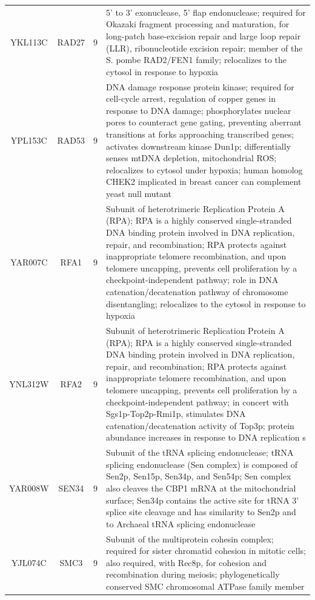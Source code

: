 \documentclass[]{article}
\begin{document}
\begin{longtable}{@{\extracolsep{3pt}} cccp{85mm}}
YKL113C & RAD27 & 9 & 5' to 3' exonuclease, 5' flap endonuclease; required for Okazaki fragment processing and maturation, for long-patch base-excision repair and large loop repair (LLR), ribonucleotide excision repair; member of the S. pombe RAD2/FEN1 family; relocalizes to the cytosol in response to hypoxia \\ 
YPL153C & RAD53 & 9 & DNA damage response protein kinase; required for cell-cycle arrest, regulation of copper genes in response to DNA damage; phosphorylates nuclear pores to counteract gene gating, preventing aberrant transitions at forks approaching transcribed genes; activates downstream kinase Dun1p; differentially senses mtDNA depletion, mitochondrial ROS; relocalizes to cytosol under hypoxia; human homolog CHEK2 implicated in breast cancer can complement yeast null mutant \\ 
YAR007C & RFA1 & 9 & Subunit of heterotrimeric Replication Protein A (RPA); RPA is a highly conserved single-stranded DNA binding protein involved in DNA replication, repair, and recombination; RPA protects against inappropriate telomere recombination, and upon telomere uncapping, prevents cell proliferation by a checkpoint-independent pathway; role in DNA catenation/decatenation pathway of chromosome disentangling; relocalizes to the cytosol in response to hypoxia \\ 
YNL312W & RFA2 & 9 & Subunit of heterotrimeric Replication Protein A (RPA); RPA is a highly conserved single-stranded DNA binding protein involved in DNA replication, repair, and recombination; RPA protects against inappropriate telomere recombination, and upon telomere uncapping, prevents cell proliferation by a checkpoint-independent pathway; in concert with Sgs1p-Top2p-Rmi1p, stimulates DNA catenation/decatenation activity of Top3p; protein abundance increases in response to DNA replication s \\ 
YAR008W & SEN34 & 9 & Subunit of the tRNA splicing endonuclease; tRNA splicing endonuclease (Sen complex) is composed of Sen2p, Sen15p, Sen34p, and Sen54p; Sen complex also cleaves the CBP1 mRNA at the mitochondrial surface; Sen34p contains the active site for tRNA 3' splice site cleavage and has similarity to Sen2p and to Archaeal tRNA splicing endonuclease \\ 
YJL074C & SMC3 & 9 & Subunit of the multiprotein cohesin complex; required for sister chromatid cohesion in mitotic cells; also required, with Rec8p, for cohesion and recombination during meiosis; phylogenetically conserved SMC chromosomal ATPase family member \\ 

\end{longtable}
\end{document}
